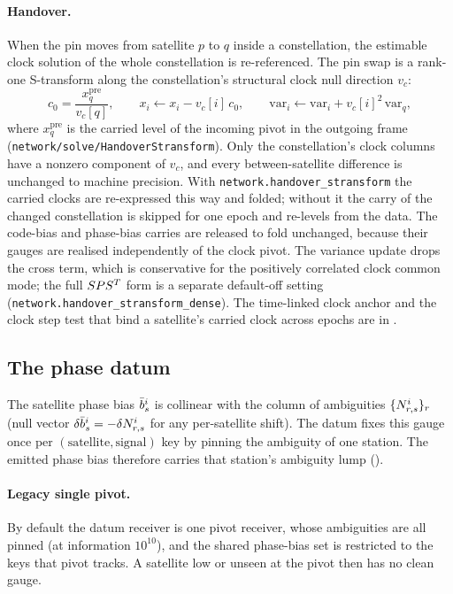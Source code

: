 \documentclass[main.tex]{subfiles}
\begin{document}
\paragraph{Handover.}
When the pin moves from satellite $p$ to $q$ inside a constellation, the
estimable clock solution of the whole constellation is re-referenced.
The pin swap is a rank-one S-transform along the constellation's
structural clock null direction $v_c$:
\begin{equation}
c_0 = \frac{x_q^{\text{pre}}}{v_c[q]},
\qquad
x_i \leftarrow x_i - v_c[i]\,c_0,
\qquad
\mathrm{var}_i \leftarrow \mathrm{var}_i + v_c[i]^2\,\mathrm{var}_q,
\label{eq:net-handover-s}
\end{equation}
where $x_q^{\text{pre}}$ is the carried level of the incoming pivot in
the outgoing frame (\texttt{network/solve/HandoverStransform}). Only the
constellation's clock columns have a nonzero component of $v_c$, and
every between-satellite difference is unchanged to machine precision.
With \texttt{network.handover\_stransform} the carried clocks are
re-expressed this way and folded; without it the carry of the changed
constellation is skipped for one epoch and re-levels from the data.
The code-bias and phase-bias carries are released to fold unchanged,
because their gauges are realised independently of the clock pivot. The
variance update drops the cross term, which is conservative for the
positively correlated clock common mode; the full $SPS^{T}$
form is a separate default-off setting
(\texttt{network.handover\_stransform\_dense}). The time-linked clock
anchor and the clock step test that bind a satellite's carried clock
across epochs are in .

\subsection{The phase datum}\label{sec:net-phasedatum}

The satellite phase bias $\bar b^i_s$ is collinear with the
column of ambiguities $\{N^i_{r,s}\}_r$ (null vector
$\delta \bar b^i_s = -\delta N^i_{r,s}$ for any
per-satellite shift). The datum fixes this gauge once per
$(\text{satellite},\text{signal})$ key by pinning the ambiguity of one
station. The emitted phase bias therefore carries that station's
ambiguity lump ().

\paragraph{Legacy single pivot.}
By default the datum receiver is one pivot receiver, whose ambiguities
are all pinned (at information $10^{10}$), and the shared phase-bias set
is restricted to the keys that pivot tracks. A satellite low or unseen at
the pivot then has no clean gauge.
\end{document}
